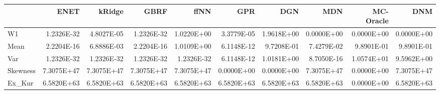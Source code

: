 \begin{tabular}{lrrrrrrrrr}
\toprule
{} &       ENET &     kRidge &       GBRF &       ffNN &        GPR &        DGN &        MDN &  MC-Oracle &        DNM \\
\midrule
W1       & 1.2326E-32 & 4.8027E-05 & 1.2326E-32 & 1.0220E+00 & 3.3779E-05 & 1.9618E+00 & 0.0000E+00 & 0.0000E+00 & 0.0000E+00 \\
Mean     & 2.2204E-16 & 6.8886E-03 & 2.2204E-16 & 1.0109E+00 & 6.1148E-12 & 9.7208E-01 & 7.4279E-02 & 9.8901E-01 & 9.8901E-01 \\
Var      & 1.2326E-32 & 1.2326E-32 & 1.2326E-32 & 1.2326E-32 & 6.1148E-12 & 1.0181E+00 & 8.7050E-16 & 1.0574E+01 & 9.5962E+00 \\
Skewness & 7.3075E+47 & 7.3075E+47 & 7.3075E+47 & 7.3075E+47 & 0.0000E+00 & 0.0000E+00 & 7.3075E+47 & 0.0000E+00 & 7.3075E+47 \\
Ex\_Kur   & 6.5820E+63 & 6.5820E+63 & 6.5820E+63 & 6.5820E+63 & 6.5820E+63 & 6.5820E+63 & 6.5820E+63 & 0.0000E+00 & 6.5820E+63 \\
\bottomrule
\end{tabular}
